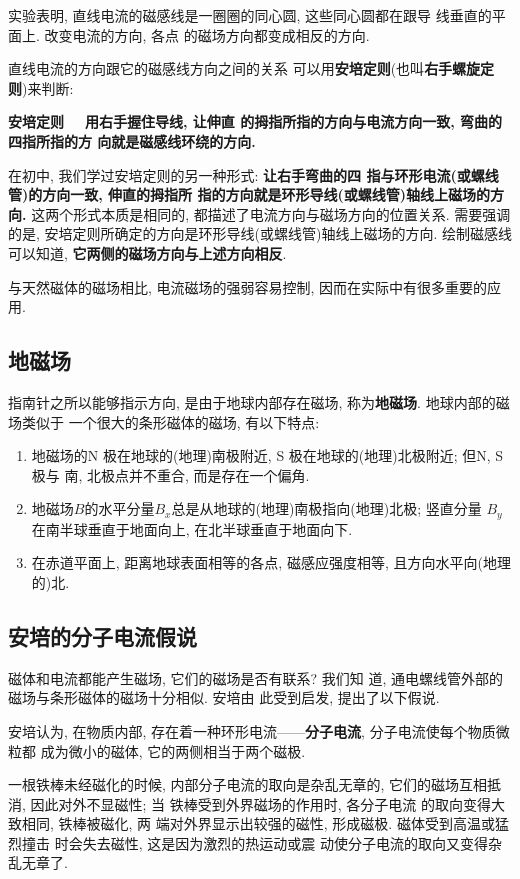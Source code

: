 \documentclass[11pt,a4paper]{ctexbook}
\newcommand{\bre}{\ \ \ }
\begin{document}
实验表明, 直线电流的磁感线是一圈圈的同心圆, 这些同心圆都在跟导
线垂直的平面上. 改变电流的方向, 各点
的磁场方向都变成相反的方向.

直线电流的方向跟它的磁感线方向之间的关系
可以用\textbf{安培定则}(也叫\textbf{右手螺旋定则})来判断:

\textbf{安培定则}\bre \textbf{用右手握住导线, 让伸直
的拇指所指的方向与电流方向一致, 弯曲的四指所指的方
向就是磁感线环绕的方向. }\bigskip

在初中, 我们学过安培定则的另一种形式: \textbf{让右手弯曲的四
指与环形电流(或螺线管)的方向一致, 伸直的拇指所
指的方向就是环形导线(或螺线管)轴线上磁场的方向.}
这两个形式本质是相同的, 都描述了电流方向与磁场方向的位置关系.
需要强调的是, 安培定则所确定的方向是环形导线(或螺线管)轴线上磁场的方向.
绘制磁感线可以知道, \textbf{它两侧的磁场方向与上述方向相反}.

与天然磁体的磁场相比, 电流磁场的强弱容易控制,
因而在实际中有很多重要的应用.

\subsection{地磁场}

指南针之所以能够指示方向, 是由于地球内部存在磁场, 称为\textbf{地磁场}. 地球内部的磁场类似于
一个很大的条形磁体的磁场, 有以下特点:

\begin{enumerate}
    \item 地磁场的N 极在地球的(地理)南极附近, S 极在地球的(地理)北极附近; 但N, S 极与
    南, 北极点并不重合, 而是存在一个偏角.
    \item 地磁场$B$的水平分量$B_x$总是从地球的(地理)南极指向(地理)北极; 竖直分量
    $B_y$在南半球垂直于地面向上, 在北半球垂直于地面向下.
    \item 在赤道平面上, 距离地球表面相等的各点, 磁感应强度相等, 且方向水平向(地理的)北.
\end{enumerate}

\subsection{安培的分子电流假说}

磁体和电流都能产生磁场, 它们的磁场是否有联系? 我们知
道, 通电螺线管外部的磁场与条形磁体的磁场十分相似. 安培由
此受到启发, 提出了以下假说.

安培认为, 在物质内部,
存在着一种环形电流——\textbf{分子电流}, 分子电流使每个物质微粒都
成为微小的磁体, 它的两侧相当于两个磁极.

一根铁棒未经磁化的时候, 内部分子电流的取向是杂乱无章的,
它们的磁场互相抵消, 因此对外不显磁性; 当
铁棒受到外界磁场的作用时, 各分子电流
的取向变得大致相同, 铁棒被磁化, 两
端对外界显示出较强的磁性, 形成磁极. 磁体受到高温或猛烈撞击
时会失去磁性, 这是因为激烈的热运动或震
动使分子电流的取向又变得杂乱无章了.
\end{document}

